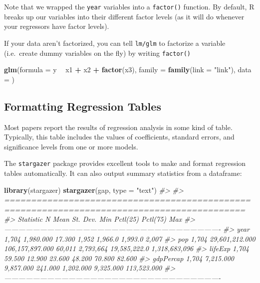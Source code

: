 \documentclass[]{book}
\newenvironment{Shaded}{\begin{snugshade}}{\end{snugshade}}
\newcommand{\CommentTok}[1]{\textcolor[rgb]{0.56,0.35,0.01}{\textit{#1}}}
\newcommand{\DataTypeTok}[1]{\textcolor[rgb]{0.13,0.29,0.53}{#1}}
\newcommand{\KeywordTok}[1]{\textcolor[rgb]{0.13,0.29,0.53}{\textbf{#1}}}
\newcommand{\NormalTok}[1]{#1}
\newcommand{\OperatorTok}[1]{\textcolor[rgb]{0.81,0.36,0.00}{\textbf{#1}}}
\newcommand{\StringTok}[1]{\textcolor[rgb]{0.31,0.60,0.02}{#1}}
\begin{document}
Note that we wrapped the \texttt{year} variables into a \texttt{factor()} function. By default, R breaks up our variables into their different factor levels (as it will do whenever your regressors have factor levels).

If your data aren't factorized, you can tell \texttt{lm/glm} to factorize a variable (i.e.~create dummy variables on the fly) by writing \texttt{factor()}

\begin{Shaded}
\begin{Highlighting}[]
\KeywordTok{glm}\NormalTok{(}\DataTypeTok{formula =}\NormalTok{ y }\OperatorTok{~}\StringTok{ }\NormalTok{x1 }\OperatorTok{+}\StringTok{ }\NormalTok{x2 }\OperatorTok{+}\StringTok{ }\KeywordTok{factor}\NormalTok{(x3), }\DataTypeTok{family =} \KeywordTok{family}\NormalTok{(}\DataTypeTok{link =} \StringTok{"link"}\NormalTok{),}
            \DataTypeTok{data =}\NormalTok{ )}
\end{Highlighting}
\end{Shaded}

\hypertarget{formatting-regression-tables}{%
\subsection{Formatting Regression Tables}\label{formatting-regression-tables}}

Most papers report the results of regression analysis in some kind of table. Typically, this table includes the values of coefficients, standard errors, and significance levels from one or more models.

The \texttt{stargazer} package provides excellent tools to make and format regression tables automatically. It can also output summary statistics from a dataframe:

\begin{Shaded}
\begin{Highlighting}[]
\KeywordTok{library}\NormalTok{(stargazer)}
\KeywordTok{stargazer}\NormalTok{(gap, }\DataTypeTok{type =} \StringTok{"text"}\NormalTok{)}
\CommentTok{#> }
\CommentTok{#> ===========================================================================================}
\CommentTok{#> Statistic   N        Mean         St. Dev.       Min   Pctl(25)    Pctl(75)        Max     }
\CommentTok{#> -------------------------------------------------------------------------------------------}
\CommentTok{#> year      1,704   1,980.000        17.300       1,952   1,966.0    1,993.0        2,007    }
\CommentTok{#> pop       1,704 29,601,212.000 106,157,897.000 60,011  2,793,664 19,585,222.0 1,318,683,096}
\CommentTok{#> lifeExp   1,704     59.500         12.900      23.600   48.200      70.800       82.600    }
\CommentTok{#> gdpPercap 1,704   7,215.000       9,857.000    241.000 1,202.000  9,325.000    113,523.000 }
\CommentTok{#> -------------------------------------------------------------------------------------------}
\end{Highlighting}
\end{Shaded}
\end{document}
